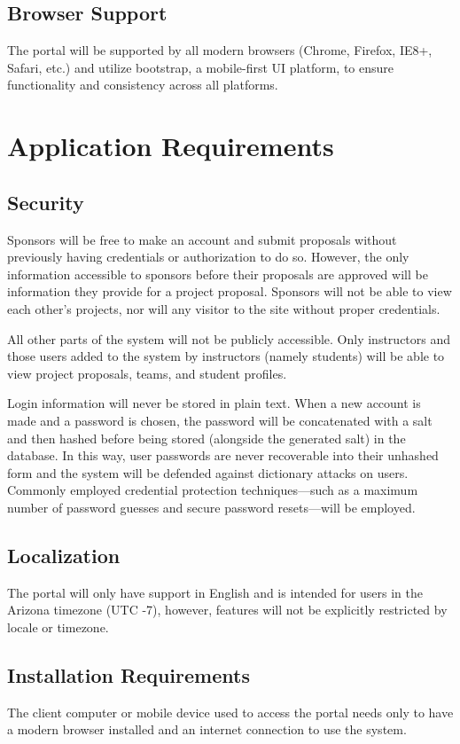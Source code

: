 \documentclass[12pt]{article}
\begin{document}
\subsection{Browser Support}
The portal will be supported by all modern browsers (Chrome, Firefox, IE8+, Safari, etc.) and utilize bootstrap, a mobile-first UI platform, to ensure functionality and consistency across all platforms.

\section{Application Requirements}

\subsection{Security}
Sponsors will be free to make an account and submit proposals without previously having credentials or authorization to do so. However, the only information accessible to sponsors before their proposals are approved will be information they provide for a project proposal. Sponsors will not be able to view each other's projects, nor will any visitor to the site without proper credentials.

All other parts of the system will not be publicly accessible. Only instructors and those users added to the system by instructors (namely students) will be able to view project proposals, teams, and student profiles.

Login information will never be stored in plain text. When a new account is made and a password is chosen, the password will be concatenated with a salt and then hashed before being stored (alongside the generated salt) in the database. In this way, user passwords are never recoverable into their unhashed form and the system will be defended against dictionary attacks on users. Commonly employed credential protection techniques---such as a maximum number of password guesses and secure password resets---will be employed.

\subsection{Localization}

The portal will only have support in English and is intended for users in the Arizona timezone (UTC -7), however, features will not be explicitly restricted by locale or timezone.

\subsection{Installation Requirements}

The client computer or mobile device used to access the portal needs only to have a modern browser installed and an internet connection to use the system.
\end{document}
